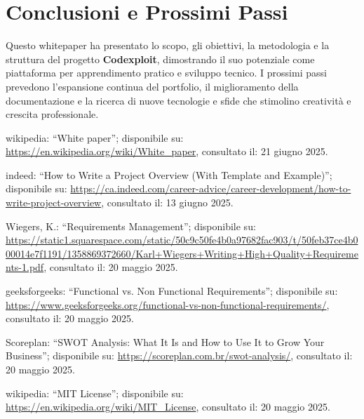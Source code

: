 \documentclass[10pt, a4paper, oneside]{article}
\begin{document}
\section{Conclusioni e Prossimi Passi}

Questo whitepaper ha presentato lo scopo, gli obiettivi, la metodologia e la struttura del progetto \textbf{Codexploit}, dimostrando il suo potenziale come piattaforma per apprendimento pratico e sviluppo tecnico. I prossimi passi prevedono l’espansione continua del portfolio, il miglioramento della documentazione e la ricerca di nuove tecnologie e sfide che stimolino creatività e crescita professionale.\newpage

%

\begin{thebibliography}{}{
\fontsize{9pt}{10pt}\selectfont

wikipedia: ``White paper''; disponibile su: \url{https://en.wikipedia.org/wiki/White_paper}, consultato il: 21 giugno 2025.

indeed: ``How to Write a Project Overview (With Template and Example)''; disponibile su: \url{https://ca.indeed.com/career-advice/career-development/how-to-write-project-overview}, consultato il: 13 giugno 2025.

Wiegers, K.: ``Requirements Management''; disponibile su: \url{https://static1.squarespace.com/static/50c9c50fe4b0a97682fac903/t/50feb37ce4b000014e7f1191/1358869372660/Karl+Wiegers+Writing+High+Quality+Requirements-1.pdf}, consultato il: 20 maggio 2025.

geeksforgeeks: ``Functional vs. Non Functional Requirements''; disponibile su: \url{https://www.geeksforgeeks.org/functional-vs-non-functional-requirements/}, consultato il: 20 maggio 2025.

Scoreplan: ``SWOT Analysis: What It Is and How to Use It to Grow Your Business''; disponibile su: \url{https://scoreplan.com.br/swot-analysis/}, consultato il: 20 maggio 2025.

wikipedia: ``MIT License''; disponibile su: \url{https://en.wikipedia.org/wiki/MIT_License}, consultato il: 20 maggio 2025.

}
\end{thebibliography}
\end{document}
